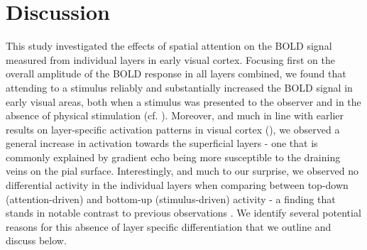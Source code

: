 \section{Discussion}
This study investigated the effects of spatial attention on the BOLD signal measured from individual layers in early visual cortex. Focusing first on the overall amplitude of the BOLD response in all layers combined, we found that attending to a stimulus reliably and substantially increased the BOLD signal in early visual areas, both when a stimulus was presented to the observer and in the absence of physical stimulation (cf. \cite{Kastner1999,Murray2008,Li2008}). Moreover, and much in line with earlier results on layer-specific activation patterns in visual cortex (\cite{Polimeni2010,Koopmans2010}), we observed a general increase in activation towards the superficial layers - one that is commonly explained by gradient echo being more susceptible to the draining veins on the pial surface. Interestingly, and much to our surprise, we observed no differential activity in the individual layers when comparing between top-down (attention-driven) and bottom-up (stimulus-driven) activity - a finding that stands in notable contrast to previous observations \cite{Kok2016}. We identify several potential reasons for this absence of layer specific differentiation that we outline and discuss below.
	
